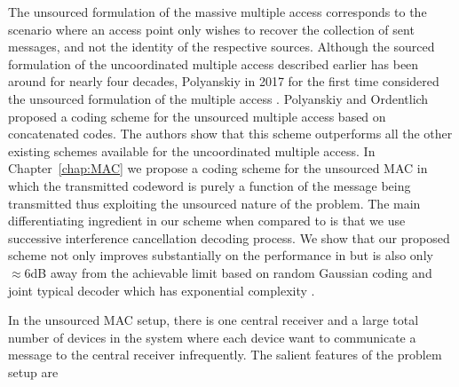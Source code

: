The unsourced formulation of the massive multiple access corresponds to the scenario where an access point only wishes to recover the collection of sent messages, and not the identity of the respective sources.  Although the sourced formulation of the uncoordinated multiple access described earlier has been around for nearly four decades, Polyanskiy in 2017 for the first time considered the unsourced formulation of the multiple access \cite{polyanskiy2017perspective}. Polyanskiy and Ordentlich \cite{ordentlich2017low} proposed a coding scheme for the unsourced multiple access based on concatenated codes. The authors show that this scheme outperforms all the other existing schemes available for the uncoordinated multiple access. In Chapter~\ref{chap:MAC} we propose a coding scheme for the unsourced MAC in which the transmitted codeword is purely a function of the message being transmitted thus exploiting  the unsourced nature of the problem. The main differentiating ingredient in our scheme when compared to \cite{ordentlich2017low} is that we use successive interference cancellation decoding process. We show that our proposed scheme not only improves substantially on the performance in \cite{ordentlich2017low} but is also only $\approx 6$dB away from the achievable limit based on random Gaussian coding and joint typical decoder which has exponential complexity \cite{polyanskiy2017perspective}. 



\iflonger
In the unsourced MAC setup, there is one central receiver and a large total number of devices in the system where each device want to communicate a message to the central receiver infrequently. The salient features of the problem setup are 

